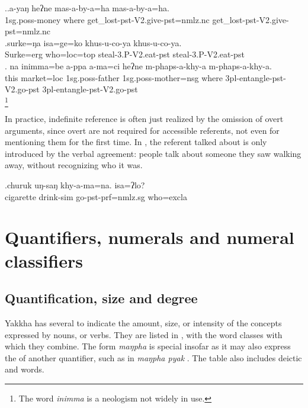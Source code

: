 \ex.\ag.a-yaŋ heʔne mas-a-by-a=ha mas-a-by-a=ha.\\
{\sc 1sg.poss-}money where get\_lost{\sc [3sg]-pst-V2.give-pst=nmlz.nc} get\_lost{\sc [3sg]-pst-V2.give-pst=nmlz.nc}\\
\bg.surke=ŋa isa=ge=ko khus-u-co-ya khus-u-co-ya.\\
Surke{\sc =erg} who{\sc =loc=top} steal{\sc -3.P-V2.eat-pst} steal{\sc -3.P-V2.eat-pst}\\
\bg. na inimma=be a-ppa  a-ma=ci heʔne m-phaps-a-khy-a  m-phaps-a-khy-a.\\
this market{\sc =loc} {\sc 1sg.poss-}father  {\sc 1sg.poss-}mother{\sc =nsg} where {\sc 3pl-}entangle{\sc -pst-V2.go-pst} {\sc 3pl-}entangle{\sc -pst-V2.go-pst}\\
\footnote{The word \emph{inimma} is a neologism not widely in use.} 

In practice, indefinite reference is often just realized by the omission of overt arguments, since overt  are not required for accessible referents, not even for mentioning them for the first time. In \Next, the referent talked about is only introduced by the verbal agreement: people talk about someone they saw walking away, without recognizing who it was.

\exg.churuk uŋ-saŋ khy-a-ma=na. isa=ʔlo?\\
cigarette drink{\sc -sim} go{\sc [3sg]-pst-prf=nmlz.sg} who{\sc =excla}\\


\section{Quantifiers, numerals and numeral classifiers}\label{sec-quant}

\subsection{Quantification, size and degree}

Yakkha has several  to indicate the amount, size,   or intensity of the concepts expressed by nouns,  or verbs. They are listed in , with the  word classes with which they combine. The form  \emph{maŋpha}  is special insofar as it may also express  the  of another quantifier, such as in \emph{maŋpha pyak} . The table also includes deictic  and  words.

